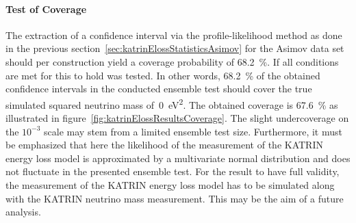 \paragraph{Test of Coverage}
The extraction of a confidence interval via the profile-likelihood method as done in the previous section~\ref{sec:katrinElossStatisticsAsimov} for the Asimov data set should per construction yield a coverage probability of \SI{68.2}{\percent}. If all conditions are met for this to hold was tested. In other words, \SI{68.2}{\percent} of the obtained confidence intervals in the conducted ensemble test should cover the true simulated squared neutrino mass of~\SI{0}{eV^2}. The obtained coverage is \SI{67.6}{\percent} as illustrated in figure~\ref{fig:katrinElossResultsCoverage}. The slight undercoverage on the $10^{-3}$ scale may stem from a limited ensemble test size. Furthermore, it must be emphasized that here the likelihood of the measurement of the KATRIN energy loss model is approximated by a multivariate normal distribution and does not fluctuate in the presented ensemble test. For the result to have full validity, the measurement of the KATRIN energy loss model has to be simulated along with the KATRIN neutrino mass measurement. This may be the aim of a future analysis.

